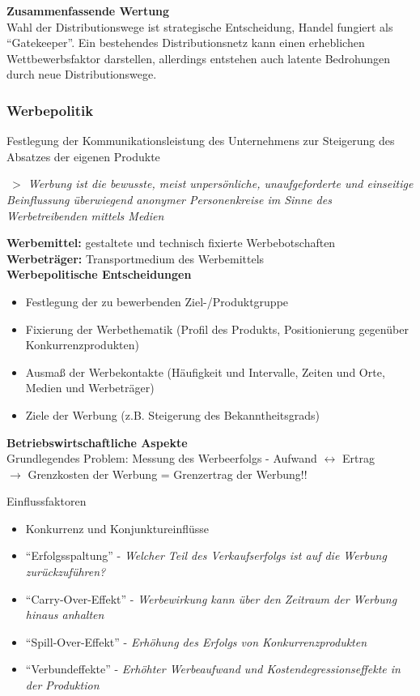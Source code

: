 \documentclass[a4paper,11pt, twoside]{article}
\begin{document}
\textbf{Zusammenfassende Wertung}\\
Wahl der Distributionswege ist strategische Entscheidung, Handel fungiert als "`Gatekeeper"'. Ein bestehendes Distributionsnetz kann einen erheblichen Wettbewerbsfaktor darstellen, allerdings entstehen auch latente Bedrohungen durch neue Distributionswege.

\subsubsection{Werbepolitik}
Festlegung der Kommunikationsleistung des Unternehmens zur Steigerung des Absatzes der eigenen Produkte

\textit{$\>>$ Werbung ist die bewusste, meist unpersönliche, unaufgeforderte und einseitige Beinflussung überwiegend anonymer Personenkreise im Sinne des Werbetreibenden mittels Medien} 

\textbf{Werbemittel:} gestaltete und technisch fixierte Werbebotschaften\\
\textbf{Werbeträger:} Transportmedium des Werbemittels\\

\textbf{Werbepolitische Entscheidungen}
\begin{itemize}
	\item Festlegung der zu bewerbenden Ziel-/Produktgruppe  
	\item Fixierung der Werbethematik (Profil des Produkts, Positionierung gegenüber Konkurrenzprodukten)
	\item Ausmaß der Werbekontakte (Häufigkeit und Intervalle, Zeiten und Orte, Medien und Werbeträger)
	\item Ziele der Werbung (z.B. Steigerung des Bekanntheitsgrads)
\end{itemize}

\textbf{Betriebswirtschaftliche Aspekte}\\
Grundlegendes Problem: Messung des Werbeerfolgs - Aufwand $\leftrightarrow$ Ertrag\\
$\rightarrow$ Grenzkosten der Werbung = Grenzertrag der Werbung!!

Einflussfaktoren
\begin{itemize}
	\item Konkurrenz und Konjunktureinflüsse
	\item "`Erfolgsspaltung"' - \textit{Welcher Teil des Verkaufserfolgs ist auf die Werbung zurückzuführen?}
	\item "`Carry-Over-Effekt"' - \textit{Werbewirkung kann über den Zeitraum der Werbung hinaus anhalten}
	\item "`Spill-Over-Effekt"' - \textit{Erhöhung des Erfolgs von Konkurrenzprodukten}
	\item "`Verbundeffekte"' - \textit{Erhöhter Werbeaufwand und Kostendegressionseffekte in der Produktion}
\end{itemize}
\end{document}
